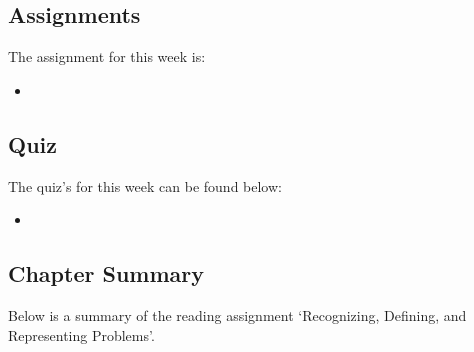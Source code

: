 \subsection{Assignments}

The assignment for this week is:

\begin{itemize}
    \item {}
\end{itemize}

\subsection{Quiz}

The quiz's for this week can be found below:

\begin{itemize}
    \item {}
\end{itemize}

\newpage

\subsection{Chapter Summary}

Below is a summary of the reading assignment `Recognizing, Defining, and Representing Problems'.

